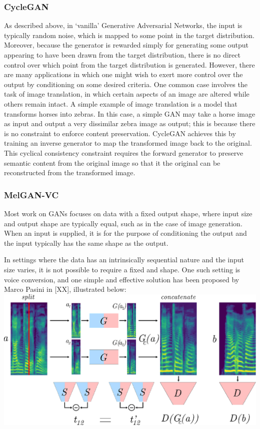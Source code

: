 \subsubsection{CycleGAN}
As described above, in `vanilla' Generative Adversarial Networks, the input is typically random noise, which is mapped to some point in the 
target distribution. Moreover, because the generator is rewarded simply for generating some output 
appearing to have been drawn from the target distribution, there is no direct control over which 
point from the target distribution is generated.
However, there are many applications in which one might wish to exert more control over the output 
by conditioning on some desired criteria. One common case involves the task of image translation,
in which certain aspects of an image are altered while others remain intact. A simple example of 
image translation is a model that transforms horses into zebras. In this case, a simple GAN may take 
a horse image as input and output a very dissimilar zebra image as output; this is because there 
is no constraint to enforce content preservation.
CycleGAN \citep{cycleganvc} achieves this by training an inverse generator to map the transformed image back to the 
original. This cyclical consistency constraint requires the forward generator to preserve semantic 
content from the original image so that it the original can be reconstructed from the transformed image.

\subsubsection{MelGAN-VC}
Most work on GANs focuses on data with a fixed output shape, where 
input size and output shape are typically equal, such as in the case of image generation. 
When an input is supplied, it is for the purpose of conditioning the output and the input 
typically has the same shape as the output.

In settings where the data has an intrinsically sequential nature and the input size varies, 
it is not possible to require a fixed and shape. One such setting is voice conversion, and one 
simple and effective solution has been proposed by Marco Pasini in [XX], illustrated below:\\
\includegraphics[width=\textwidth]{img/img_melganvc.png}

